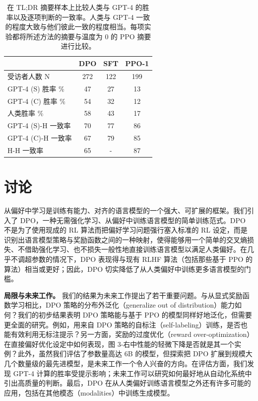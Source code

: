 \documentclass[11pt,UTF8,fontset=fandol]{ctexart}
\begin{document}
\begin{table}[H]\centering
\caption{在 TL;DR 摘要样本上比较人类与 GPT-4 的胜率以及逐项判断的一致率。人类与 GPT-4 一致的程度大致与他们彼此一致的程度相当。每项实验都将所述方法的摘要与温度为 0 的 PPO 摘要进行比较。}
\label{tab:2}
\begin{tabular}{lccc}
\toprule
 & DPO & SFT & PPO-1 \\
\midrule
受访者人数 N & 272 & 122 & 199 \\
GPT-4 (S) 胜率 \% & 47 & 27 & 13 \\
GPT-4 (C) 胜率 \% & 54 & 32 & 12 \\
人类胜率 \% & 58 & 43 & 17 \\
GPT-4 (S)-H 一致率 & 70 & 77 & 86 \\
GPT-4 (C)-H 一致率 & 67 & 79 & 85 \\
H-H 一致率 & 65 & - & 87 \\
\bottomrule
\end{tabular}
\end{table}

\section{讨论}

从偏好中学习是训练有能力、对齐的语言模型的一个强大、可扩展的框架。我们引入了 DPO，一种无需强化学习、从偏好中训练语言模型的简单训练范式。DPO 不是为了使用现成的 RL 算法而把偏好学习问题强行塞入标准的 RL 设定，而是识别出语言模型策略与奖励函数之间的一种映射，使得能够用一个简单的交叉熵损失、不借助强化学习、也不损失一般性地直接训练语言模型以满足人类偏好。在几乎不调超参数的情况下，DPO 表现得与现有 RLHF 算法（包括那些基于 PPO 的算法）相当或更好；因此，DPO 切实降低了从人类偏好中训练更多语言模型的门槛。

\textbf{局限与未来工作。} 我们的结果为未来工作提出了若干重要问题。与从显式奖励函数学习相比，DPO 策略的分布外泛化（generalize out of distribution）能力如何？我们的初步结果表明 DPO 策略能与基于 PPO 的模型同样好地泛化，但需要更全面的研究。例如，用来自 DPO 策略的自标注（self-labeling）训练，是否也能有效利用无标注提示？另一方面，奖励的过度优化（reward over-optimization）在直接偏好优化设定中如何表现，图 3-右中性能的轻微下降是否就是其一个实例？此外，虽然我们评估了参数量高达 6B 的模型，但探索把 DPO 扩展到规模大几个数量级的最先进模型，是未来工作一个令人兴奋的方向。在评估方面，我们发现 GPT-4 计算的胜率受提示影响；未来工作可以研究如何最好地从自动化系统中引出高质量的判断。最后，DPO 在从人类偏好训练语言模型之外还有许多可能的应用，包括在其他模态（modalities）中训练生成模型。
\end{document}
